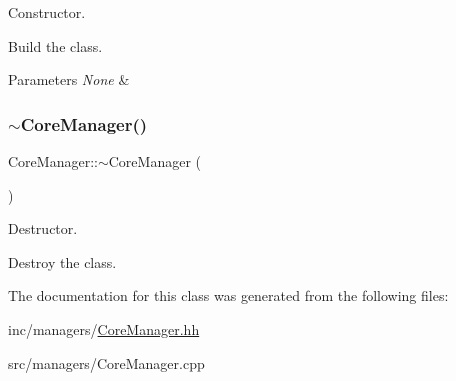 Constructor. 

Build the class.


\begin{DoxyParams}{Parameters}
{\em None} & \\
\hline
\end{DoxyParams}
\mbox{\label{classCoreManager_ac3489a741174a8d5e09effe11df18100}} 
\subsubsection{\texorpdfstring{$\sim$\+Core\+Manager()}{~CoreManager()}}
{\footnotesize\ttfamily Core\+Manager\+::$\sim$\+Core\+Manager (\begin{DoxyParamCaption}{ }\end{DoxyParamCaption})}



Destructor. 

Destroy the class. 

The documentation for this class was generated from the following files\+:\begin{DoxyCompactItemize}
\item 
inc/managers/\hyperlink{CoreManager_8hh}{Core\+Manager.\+hh}\item 
src/managers/Core\+Manager.\+cpp\end{DoxyCompactItemize}
